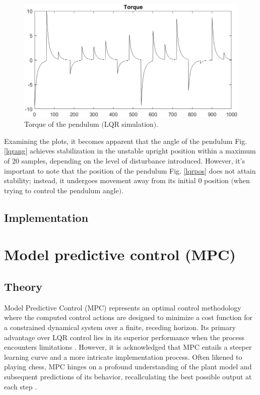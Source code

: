 \begin{figure}[!tbh]
	\centering
	\includegraphics[width=130mm]{obr/torquelqr.png}
	\caption{Torque of the pendulum $($LQR simulation$)$.}\label{lqrTorq}
\end{figure}

Examining the plots, it becomes apparent that the angle of the pendulum Fig. \ref{lqrang} achieves stabilization in the unstable upright position within a maximum of 20 samples, depending on the level of disturbance introduced. However, it's important to note that the position of the pendulum Fig. \ref{lqrpos} does not attain stability; instead, it undergoes movement away from its initial 0 position $($when trying to control the pendulum angle$)$.

\subsection{Implementation}

\newpage
\section{Model predictive control (MPC)}
\subsection{Theory}
Model Predictive Control (MPC) represents an optimal control methodology where the computed control actions are designed to minimize a cost function for a constrained dynamical system over a finite, receding horizon. Its primary advantage over LQR control lies in its superior performance when the process encounters limitations \cite{zaklPredRiad}. However, it is acknowledged that MPC entails a steeper learning curve and a more intricate implementation process. Often likened to playing chess, MPC hinges on a profound understanding of the plant model and subsequent predictions of its behavior, recallculating the best possible output at each step \cite{zaklPredRiad}\cite{mpcLecture}.

